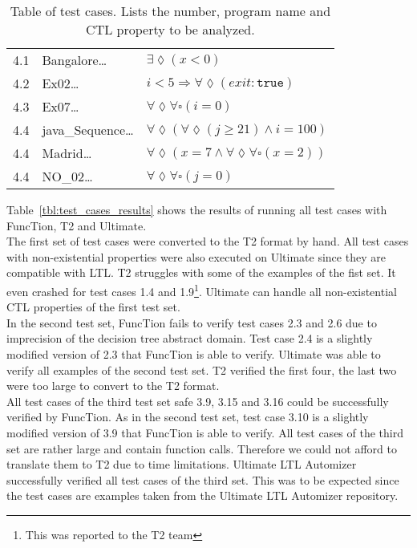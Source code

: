 \documentclass[11pt,a4paper,titlepage]{article}
\theoremstyle{definition}
\begin{document}
\begin{table}
\begin{tabular}{l l l}
\hline
4.1 & Bangalore\dots & $\exists\lozenge(x < 0)$ \\
4.2 & Ex02\dots & $i < 5 \Rightarrow \forall\lozenge(exit: \mathtt{true})$ \\
4.3 & Ex07\dots & $\forall\lozenge\forall\square(i = 0)$ \\
4.4 & java\_Sequence\dots & $\forall\lozenge(\forall\lozenge(j \geq 21) \land i = 100)$ \\
4.4 & Madrid\dots & $\forall\lozenge(x = 7 \land \forall\lozenge\forall\square(x = 2))$ \\
4.4 & NO\_02\dots & $\forall\lozenge\forall\square(j = 0)$ \\
\end{tabular}
\caption{Table of test cases. Lists the number, program name and CTL property to be analyzed.}
\label{tbl:test_cases}
\end{table}


Table~\ref{tbl:test_cases_results} shows the results of running all test cases with FuncTion, T2 and Ultimate.\\

The first set of test cases were converted to the T2 format by hand. 
All test cases with non-existential properties were also executed on Ultimate since they are compatible with LTL.
T2 struggles with some of the examples of the fist set. It even crashed for test cases 1.4 and 1.9\footnote{This was reported to the T2 team}.  
Ultimate can handle all non-existential CTL properties of the first test set.\\

In the second test set, FuncTion fails to verify test cases 2.3 and 2.6 due to imprecision of the decision tree abstract domain. 
Test case 2.4 is a slightly modified version of 2.3 that FuncTion is able to verify.
Ultimate was able to verify all examples of the second test set. 
T2 verified the first four, the last two were too large to convert to the T2 format.\\

All test cases of the third test set safe 3.9, 3.15 and 3.16 could be successfully verified by FuncTion. 
As in the second test set, test case 3.10 is a slightly modified version of 3.9 that FuncTion is able to verify.
All test cases of the third set are rather large and contain function calls. Therefore we could not afford to translate them
to T2 due to time limitations. Ultimate LTL Automizer successfully verified all test cases of the third set. 
This was to be expected since the test cases are examples taken from the Ultimate LTL Automizer repository.\\
\end{document}
